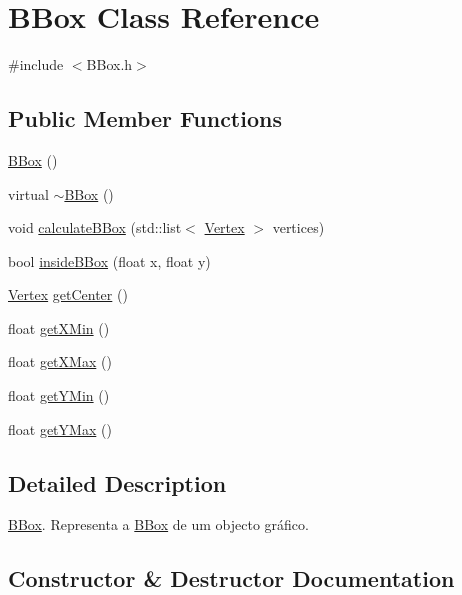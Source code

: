 \hypertarget{class_b_box}{}\section{B\+Box Class Reference}
\label{class_b_box}


{\ttfamily \#include $<$B\+Box.\+h$>$}

\subsection*{Public Member Functions}
\begin{DoxyCompactItemize}
\item 
\hyperlink{class_b_box_ae26e694ee88779b928e8d3726f8213a1}{B\+Box} ()
\item 
virtual \hyperlink{class_b_box_acba318726fe0da14cd8424b49d477c7b}{$\sim$\+B\+Box} ()
\item 
void \hyperlink{class_b_box_ae70c8c325f859e756612cf2779941e28}{calculate\+B\+Box} (std\+::list$<$ \hyperlink{class_vertex}{Vertex} $>$ vertices)
\item 
bool \hyperlink{class_b_box_afab37eda03e3703ae21113cc21f4aa24}{inside\+B\+Box} (float x, float y)
\item 
\hyperlink{class_vertex}{Vertex} \hyperlink{class_b_box_ac005bd929e6dfa149f19baa4d4383138}{get\+Center} ()
\item 
float \hyperlink{class_b_box_a170ab8a1d4e78ec5acb8e88e6798bb33}{get\+X\+Min} ()
\item 
float \hyperlink{class_b_box_a52c750ccefca227b7b3ca04508c79f7a}{get\+X\+Max} ()
\item 
float \hyperlink{class_b_box_a002fb7b8ca458af6bccfcfa37c65df11}{get\+Y\+Min} ()
\item 
float \hyperlink{class_b_box_a9fa50aa4626f186d84c1ab72cd725c3f}{get\+Y\+Max} ()
\end{DoxyCompactItemize}


\subsection{Detailed Description}
\hyperlink{class_b_box}{B\+Box}. Representa a \hyperlink{class_b_box}{B\+Box} de um objecto gráfico. 

\subsection{Constructor \& Destructor Documentation}
\hypertarget{class_b_box_ae26e694ee88779b928e8d3726f8213a1}{}
